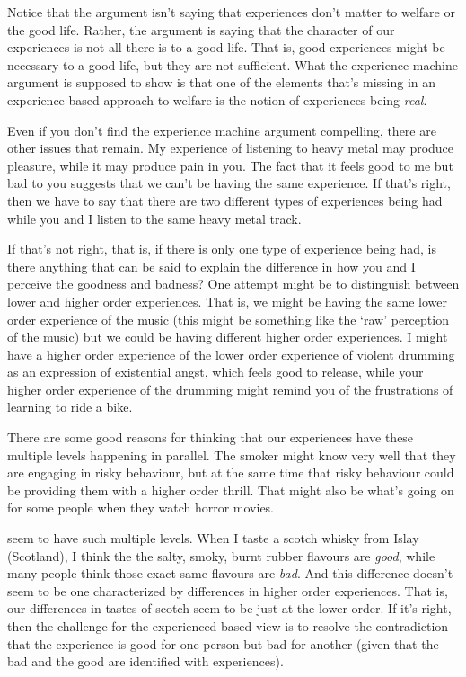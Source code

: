 \documentclass[]{tufte-book}
\begin{document}
Notice that the argument isn't saying that experiences don't matter to welfare or the good life. Rather, the argument is saying that the character of our experiences is not all there is to a good life. That is, good experiences might be necessary to a good life, but they are not sufficient. What the experience machine argument is supposed to show is that one of the elements that's missing in an experience-based approach to welfare is the notion of experiences being \emph{real}.

Even if you don't find the experience machine argument compelling, there are other issues that remain. My experience of listening to heavy metal may produce pleasure, while it may produce pain in you. The fact that it feels good to me but bad to you suggests that we can't be having the same experience. If that's right, then we have to say that there are two different types of experiences being had while you and I listen to the same heavy metal track.

If that's not right, that is, if there is only one type of experience being had, is there anything that can be said to explain the difference in how you and I perceive the goodness and badness? One attempt might be to distinguish between lower and higher order experiences. That is, we might be having the same lower order experience of the music (this might be something like the `raw' perception of the music) but we could be having different higher order experiences. I might have a higher order experience of the lower order experience of violent drumming as an expression of existential angst, which feels good to release, while your higher order experience of the drumming might remind you of the frustrations of learning to ride a bike.

There are some good reasons for thinking that our experiences have these multiple levels happening in parallel. The smoker might know very well that they are engaging in risky behaviour, but at the same time that risky behaviour could be providing them with a higher order thrill. That might also be what's going on for some people when they watch horror movies.

 seem to have such multiple levels. When I taste a scotch whisky from Islay (Scotland), I think the the salty, smoky, burnt rubber flavours are \emph{good}, while many people think those exact same flavours are \emph{bad}. And this difference doesn't seem to be one characterized by differences in higher order experiences. That is, our differences in tastes of scotch seem to be just at the lower order. If it's right, then the challenge for the experienced based view is to resolve the contradiction that the experience is good for one person but bad for another (given that the bad and the good are identified with experiences).
\end{document}

